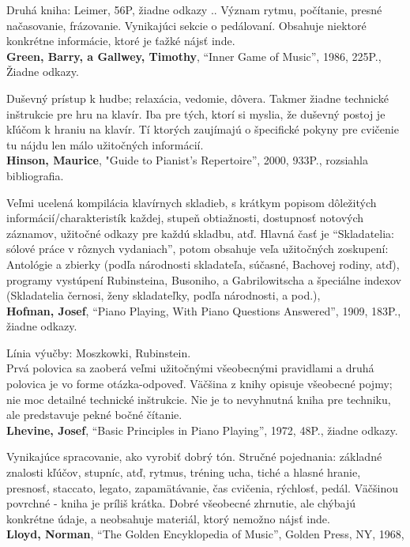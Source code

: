 \documentclass[11pt,a4paper]{book}
\begin{document}
Druhá kniha: Leimer, 56P, žiadne odkazy .. Význam rytmu, počítanie, presné načasovanie, frázovanie. Vynikajúci sekcie o pedálovaní. Obsahuje niektoré konkrétne informácie, ktoré je ťažké nájsť inde.
\medskip\\
\textbf{Green, Barry, a Gallwey, Timothy}, “Inner Game of Music”, 1986, 225P., Žiadne odkazy. 

Duševný prístup k hudbe; relaxácia, vedomie, dôvera. Takmer žiadne technické inštrukcie pre hru na klavír. Iba pre tých, ktorí si myslia, že duševný postoj je kľúčom k hraniu na klavír. Tí ktorých zaujímajú o špecifické pokyny pre cvičenie tu nájdu len málo užitočných informácií.
\medskip\\
\textbf{Hinson, Maurice}, "Guide to Pianist’s Repertoire”, 2000, 933P., rozsiahla bibliografia. 

Veľmi ucelená kompilácia klavírnych skladieb, s krátkym popisom dôležitých informácií/cha\-rak\-te\-ris\-tík každej, stupeň obtiažnosti, dostupnosť notových záznamov, užitočné odkazy pre každú skladbu, atď. Hlavná časť je “Skladatelia: sólové práce v rôznych vydaniach”, potom obsahuje veľa užitočných zoskupení: Antológie a zbierky (podľa národnosti skladateľa, súčasné, Bachovej rodiny, atď), programy vystúpení Rubinsteina, Busoniho, a Gabrilowitscha a špeciálne indexov (Skladatelia černosi, ženy skladateľky, podľa národnosti, a pod.), 
\medskip\\
\textbf{Hofman, Josef}, “Piano Playing, With Piano Questions Answered”, 1909, 183P., žiadne odkazy.

Línia výučby: Moszkowki, Rubinstein.\\
Prvá polovica sa zaoberá veľmi užitočnými všeobecnými pravidlami a druhá polovica je vo forme otázka-odpoveď. Väčšina z knihy opisuje všeobecné pojmy; nie moc detailné technické inštrukcie. Nie je to nevyhnutná kniha pre techniku, ale predstavuje pekné bočné čítanie.
\medskip\\
\textbf{Lhevine, Josef}, “Basic Principles in Piano Playing”, 1972, 48P., žiadne odkazy. 

Vynikajúce spracovanie, ako vyrobiť dobrý tón. Stručné pojednania: základné znalosti kľúčov, stupníc, atď, rytmus, tréning ucha, tiché a hlasné hranie, presnosť, staccato, legato, zapamätávanie, čas cvičenia, rýchlosť, pedál. Väčšinou povrchné - kniha je príliš krátka. Dobré všeobecné zhrnutie, ale chýbajú konkrétne údaje, a neobsahuje materiál, ktorý nemožno nájsť inde.
\medskip\\
\textbf{Lloyd, Norman}, “The Golden Encyklopedia of Music”, Golden Press, NY, 1968, 
\end{document}
